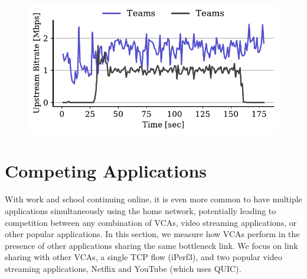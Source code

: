 \begin{figure}[th]
    \centering
    \includegraphics[width=0.9\linewidth]{figures/comp_ts/teams_teams_3_ul_r3.pdf}
    \caption{}
	\label{fig:teams-teams-3}
\end{figure}

\section{Competing Applications}
\label{sec:competition}

With work and school continuing online, it is even more common to have multiple
applications simultaneously using the home network, potentially leading to
competition between any combination of VCAs, video streaming applications, or other popular
applications. In this section, we measure how VCAs perform in the presence of
other applications sharing the same bottleneck link. We focus on
link sharing with other VCAs, a single TCP flow (iPerf3), and two popular
video streaming applications, Netflix and YouTube (which uses QUIC).


